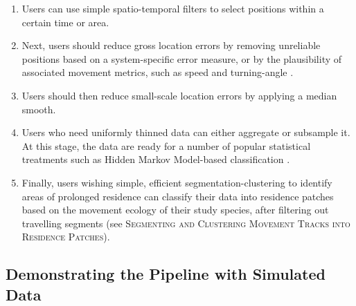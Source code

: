 \documentclass[10pt,paper=a4,headings=standardclasses
]{scrartcl}
\begin{document}
\begin{enumerate}
    
    
    
    \item Users can use simple spatio-temporal filters to select positions within a certain time or area.
    \item Next, users should reduce gross location errors by removing unreliable positions based on a system-specific error measure, or by the plausibility of associated movement metrics, such as speed and turning-angle \citep{seidel2018, calenge2009}.
    \item Users should then reduce small-scale location errors by applying a median smooth.
    \item Users who need uniformly thinned data can either aggregate or subsample it.
    At this stage, the data are ready for a number of popular statistical treatments such as Hidden Markov Model-based classification \citep{michelot2016,langrock2012}.
    \item Finally, users wishing simple, efficient segmentation-clustering to identify areas of prolonged residence can classify their data into residence patches based on the movement ecology of their study species, after filtering out travelling segments (see \textsc{Segmenting and Clustering Movement Tracks into Residence Patches}).
    
\end{enumerate}

\subsection{Demonstrating the Pipeline with Simulated Data}
\end{document}
